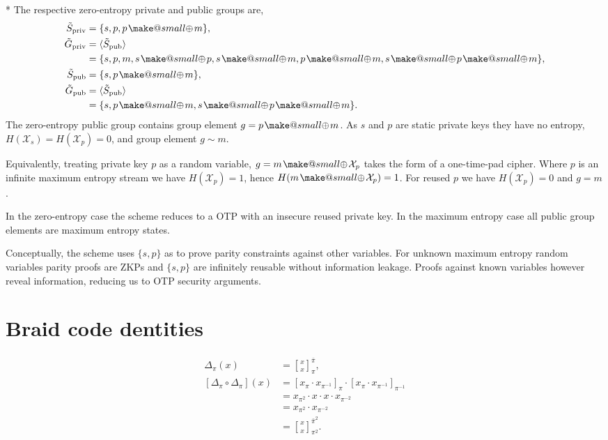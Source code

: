 \documentclass[twocolumn, aps, amsmath, amssymb, nofootinbib, superscriptaddress, longbibliography, doublefloatfix, table-of-contents, eqsecnum, rmp]{revtex4-2}
\makeatletter
\newcommand{\stackbraid}[2]{{\genfrac{[}{]}{0pt}{}{{#1}}{{#2}}}^{\bar{\pi}}_{\pi}}
\newcommand{\stackbraidpow}[3]{{\genfrac{[}{]}{0pt}{}{{#1}}{{#2}}}^{\bar{\pi}^{#3}}_{\pi^#3}}
\newcommand{\soplus}{{{\hspace{1pt}}{\mathbin{\mathpalette\make@small{\mathbin\oplus}}}}{\hspace{1pt}}}
\newcommand{\make@small}[2]{%
  \vcenter{\hbox{%
    \scalebox{0.6}{$\m@th#1#2$}%
  }}%
}
\makeatother
\begin{document}
* The respective zero-entropy private and public groups are,
\begin{align}
	{\tilde S}_\mathrm{priv} &= \{s, p, p \soplus m\},\nonumber\\
	{\tilde G}_\mathrm{priv} &= \langle {\tilde S}_\mathrm{pub} \rangle \nonumber\\
	&= \{s, p, m, s\soplus p, s\soplus m, p\soplus m, s\soplus p\soplus m\},\nonumber\\
	{\tilde S}_\mathrm{pub} &= \{s, p \soplus m\},\nonumber\\
	{\tilde G}_\mathrm{pub} &= \langle {\tilde S}_\mathrm{pub} \rangle \nonumber\\
	&= \{s, p\soplus m, s\soplus p\soplus m\}.
\end{align}
The zero-entropy public group contains group element $g=p\soplus m$. As $s$ and $p$ are static private keys they have no entropy, $H(\mathcal{X}_s)=H(\mathcal{X}_p)=0$, and group element $g \sim m$.

Equivalently, treating private key $p$ as a random variable, $g=m\soplus \mathcal{X}_p$ takes the form of a one-time-pad cipher. Where $p$ is an infinite maximum entropy stream we have $H(\mathcal{X}_p)=1$, hence $H(m\soplus \mathcal{X}_p) = 1$. For reused $p$ we have $H(\mathcal{X}_p)=0$ and $g=m$.

In the zero-entropy case the scheme reduces to a OTP with an insecure reused private key. In the maximum entropy case all public group elements are maximum entropy states.

Conceptually, the scheme uses $\{s,p\}$ as to prove parity constraints against other variables. For unknown maximum entropy random variables parity proofs are ZKPs and $\{s,p\}$ are infinitely reusable without information leakage. Proofs against known variables however reveal information, reducing us to OTP security arguments. 

\section{Braid code dentities}

\begin{align}
	\Delta_\pi(x) &= \stackbraid{x}{x},\nonumber\\
	[\Delta_\pi \circ\Delta_\pi](x) &= [x_\pi \cdot x_{\pi^{-1}}]_\pi \cdot [x_\pi \cdot x_{\pi^{-1}}]_{\pi^{-1}} \nonumber\\
	&= x_{\pi^{2}} \cdot x \cdot x \cdot x_{\pi^{-2}} \nonumber\\
	&= x_{\pi^{2}} \cdot x_{\pi^{-2}} \nonumber\\
	&= \stackbraidpow{x}{x}{2}.
\end{align}
\end{document}
